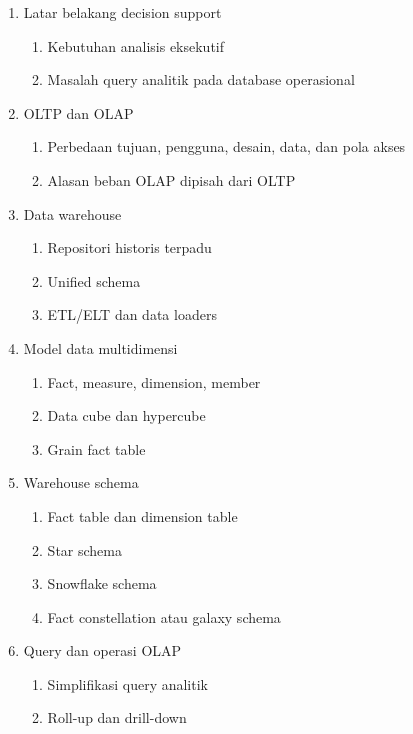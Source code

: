 \begin{enumerate}
    \item \pwajib Latar belakang decision support
    \begin{enumerate}
        \item \pwajib Kebutuhan analisis eksekutif
        \item \pwajib Masalah query analitik pada database operasional
    \end{enumerate}
    \item \pwajib OLTP dan OLAP
    \begin{enumerate}
        \item \pwajib Perbedaan tujuan, pengguna, desain, data, dan pola akses
        \item \pwajib Alasan beban OLAP dipisah dari OLTP
    \end{enumerate}
    \item \pwajib Data warehouse
    \begin{enumerate}
        \item \pwajib Repositori historis terpadu
        \item \pwajib Unified schema
        \item \ppaham ETL/ELT dan data loaders
    \end{enumerate}
    \item \pwajib Model data multidimensi
    \begin{enumerate}
        \item \pwajib Fact, measure, dimension, member
        \item \pwajib Data cube dan hypercube
        \item \ppaham Grain fact table
    \end{enumerate}
    \item \pwajib Warehouse schema
    \begin{enumerate}
        \item \pwajib Fact table dan dimension table
        \item \pwajib Star schema
        \item \pwajib Snowflake schema
        \item \ppaham Fact constellation atau galaxy schema
    \end{enumerate}
    \item \pwajib Query dan operasi OLAP
    \begin{enumerate}
        \item \pwajib Simplifikasi query analitik
        \item \pwajib Roll-up dan drill-down

\end{enumerate}
\end{enumerate}
